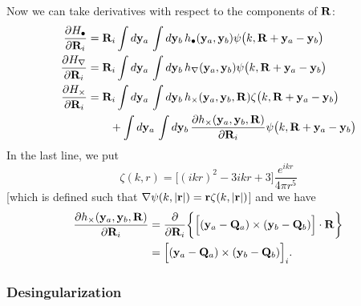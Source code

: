 \documentclass[dvips,letterpaper]{article}
\begin{document}
Now we can take derivatives with respect to the components 
of $\mathbf{R}$:
\begin{align*}
  \frac{\partial H_\bullet}{\partial \mathbf{R}_i}
&= \mathbf{R}_i 
   \int d\mathbf{y}_a \, \int d\mathbf{y}_b \,
   h_\bullet(\mathbf{y}_a, \mathbf{y}_b)
   \psi\big(k, \mathbf{R} + \mathbf{y}_a - \mathbf{y}_b \big) 
\\
  \frac{\partial H_\nabla}{\partial \mathbf{R}_i}
&= \mathbf{R}_i 
   \int d\mathbf{y}_a \, \int d\mathbf{y}_b \,
   h_\nabla(\mathbf{y}_a, \mathbf{y}_b)
   \psi\big(k, \mathbf{R} + \mathbf{y}_a - \mathbf{y}_b \big)
\\
  \frac{\partial H_\times}{\partial \mathbf{R}_i}
&= \mathbf{R}_i 
   \int d\mathbf{y}_a \, \int d\mathbf{y}_b \,
   h_\times(\mathbf{y}_a, \mathbf{y}_b, \mathbf{R})
   \zeta\big(k, \mathbf{R} + \mathbf{y}_a - \mathbf{y}_b \big)
\\
&\qquad + 
   \int d\mathbf{y}_a \, \int d\mathbf{y}_b \,
   \frac{\partial h_\times(\mathbf{y}_a, \mathbf{y}_b, \mathbf{R})}{\partial \mathbf{R}_i}
   \psi\big(k, \mathbf{R} + \mathbf{y}_a - \mathbf{y}_b \big)
\end{align*}
In the last line, we put
$$ \zeta(k, r) = \Big[ (ikr)^2 -3ikr + 3\Big]\frac{e^{ikr}}{4\pi r^5}$$
[which is defined such that $\nabla \psi(k,|\mathbf{r}|) = \mathbf{r} \zeta(k, |\mathbf{r}|)$]
and we have 
\begin{align*}
 \frac{\partial  h_\times(\mathbf{y}_a, \mathbf{y}_b, \mathbf{R})}{\partial \mathbf{R}_i}
&=\frac{\partial }{\partial \mathbf{R}_i} 
   \bigg\{ \Big[ (\mathbf{y}_a - \mathbf{Q}_a) \times (\mathbf{y}_b - \mathbf{Q}_b) \Big]
           \cdot \mathbf{R} 
   \bigg\}
\\
&= \Big[ (\mathbf{y}_a - \mathbf{Q}_a) \times (\mathbf{y}_b - \mathbf{Q}_b) \Big]_i.
\end{align*}

\subsubsection*{Desingularization}
\end{document}
